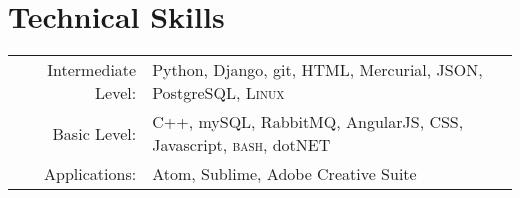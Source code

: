 \documentclass[a4paper,10pt]{article}
\begin{document}
\section{Technical Skills}
\begin{tabular}{rl}
 Intermediate Level:& Python, Django, git, \textsc{HTML}, Mercurial, \textsc{JSON}, Postgre\textsc{SQL},  \textsc{Linux} \setmainfont[SmallCapsFont=Fontin-SmallCaps.otf]{Fontin.otf}\\
 Basic Level:& \textsc{C++}, my\textsc{SQL}, RabbitMQ, AngularJS, \textsc{CSS}, Javascript, \textsc{bash}, dot\textsc{NET}\\
Applications:& Atom, Sublime, Adobe Creative Suite\\
\end{tabular}


\end{document}
